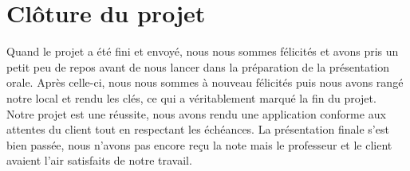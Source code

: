 \documentclass[t, 12pt, usenames,dvipsnames]{article}
\begin{document}
    \section{Clôture du projet}
        \noindent Quand le projet a été fini et envoyé, nous nous sommes félicités et avons pris un petit peu de repos avant de nous lancer dans la préparation de la présentation orale. Après celle-ci, nous nous sommes à nouveau félicités puis nous avons rangé notre local et rendu les clés, ce qui a véritablement marqué la fin du projet.\\
        Notre projet est une réussite, nous avons rendu une application conforme aux attentes du client tout en respectant les échéances. La présentation finale s'est bien passée, nous n'avons pas encore reçu la note mais le professeur et le client avaient l'air satisfaits de notre travail.\\
    
\end{document}
